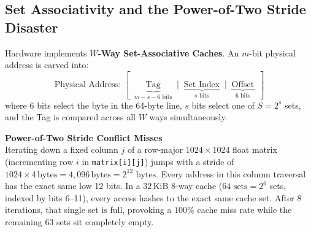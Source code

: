 \subsection{Set Associativity and the Power-of-Two Stride Disaster}

Hardware implements \textbf{$W$-Way Set-Associative Caches}. An $m$-bit physical address is carved into:
\[
    \text{Physical Address: } [\;\; \underbrace{\text{Tag}}_{m - s - 6\text{ bits}} \;\;\big|\;\; \underbrace{\text{Set Index}}_{s\text{ bits}} \;\;\big|\;\; \underbrace{\text{Offset}}_{6\text{ bits}} \;\;]
\]
where 6 bits select the byte in the 64-byte line, $s$ bits select one of $S = 2^s$ sets,
and the Tag is compared across all $W$ ways simultaneously.

\begin{trapbox}
\textbf{Power-of-Two Stride Conflict Misses}\\
Iterating down a fixed column $j$ of a row-major $1024 \times 1024$ float matrix
(incrementing row $i$ in \texttt{matrix[i][j]})
jumps with a stride of $1024 \times 4\,\text{bytes} = 4{,}096\,\text{bytes} = 2^{12}\text{ bytes}$.
Every address in this column traversal has the exact same low 12 bits.
In a $32\,\text{KiB}$ 8-way cache ($64\text{ sets} = 2^6$ sets, indexed by bits 6--11),
every access hashes to the exact same cache set. After 8 iterations, that single set is full,
provoking a $100\%$ cache miss rate while the remaining 63 sets sit completely empty.
\end{trapbox}

